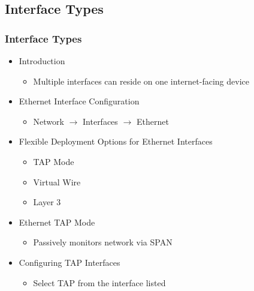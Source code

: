 \subsection{Interface Types}
\subsubsection{Interface Types}
    \begin{itemize}
        \item Introduction
            \begin{itemize}
                \item Multiple interfaces can reside on one internet-facing device
            \end{itemize}
        \item Ethernet Interface Configuration
            \begin{itemize}
                \item Network $\rightarrow$ Interfaces $\rightarrow$ Ethernet
            \end{itemize}
        \item Flexible Deployment Options for Ethernet Interfaces
            \begin{itemize}
                \item TAP Mode
                \item Virtual Wire
                \item Layer 3
            \end{itemize}
        \item Ethernet TAP Mode
            \begin{itemize}
                \item Passively monitors network via SPAN
            \end{itemize}
        \item Configuring TAP Interfaces
            \begin{itemize}
                \item Select TAP from the interface listed
            \end{itemize}
    \end{itemize}

